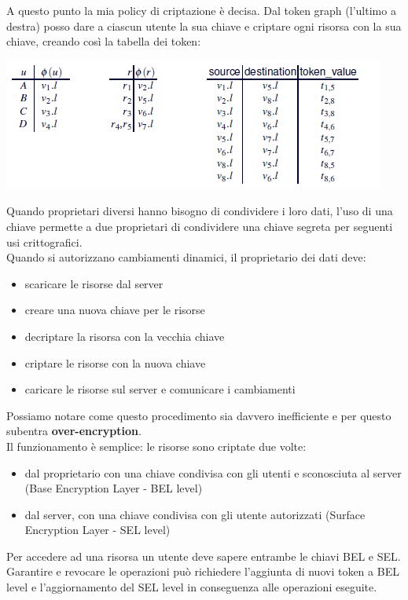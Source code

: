 A questo punto la mia policy di criptazione è decisa.
Dal token graph (l'ultimo a destra) posso dare a ciascun utente la sua chiave e criptare ogni risorsa con la sua chiave, creando così la tabella dei token:
\begin{center}
    \includegraphics[scale=0.7]{img/tokentab.png}
\end{center}
Quando proprietari diversi hanno bisogno di condividere i loro dati, l'uso di una chiave permette a due proprietari di condividere una chiave segreta per seguenti usi crittografici.\\
Quando si autorizzano cambiamenti dinamici, il proprietario dei dati deve:
\begin{itemize}
    \item scaricare le risorse dal server
    \item creare una nuova chiave per le risorse
    \item decriptare la risorsa con la vecchia chiave
    \item criptare le risorse con la nuova chiave
    \item caricare le risorse sul server e comunicare i cambiamenti
\end{itemize}
Possiamo notare come questo procedimento sia davvero inefficiente e per questo subentra \textbf{over-encryption}.\\
Il funzionamento è semplice: le risorse sono criptate due volte:
\begin{itemize}
    \item dal proprietario con una chiave condivisa con gli utenti e sconosciuta al server (Base Encryption Layer - BEL level)
    \item dal server, con una chiave condivisa con gli utente autorizzati (Surface Encryption Layer - SEL level)
\end{itemize}
Per accedere ad una risorsa un utente deve sapere entrambe le chiavi BEL e SEL.\\
Garantire e revocare le operazioni può richiedere l'aggiunta di nuovi token a BEL level e l'aggiornamento del SEL level in conseguenza alle operazioni eseguite.\\
